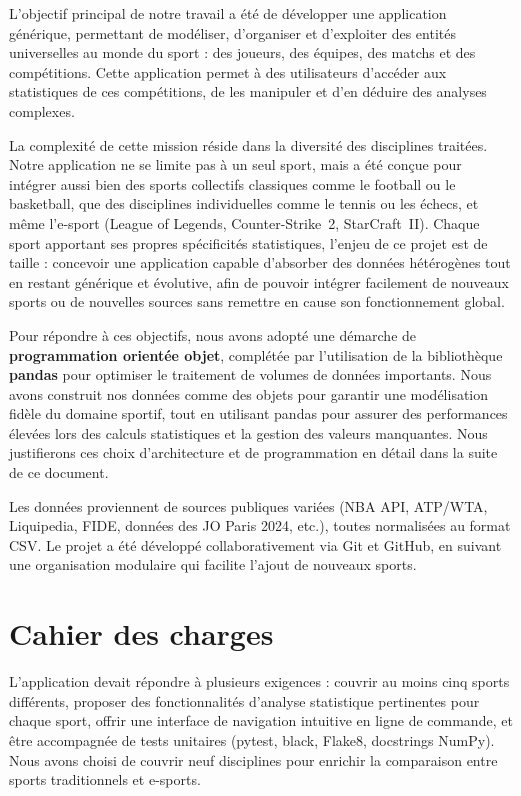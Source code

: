 \documentclass[12pt,a4paper]{article}
\begin{document}
L'objectif principal de notre travail a été de développer une application générique,
permettant de modéliser, d'organiser et d'exploiter des entités universelles au monde du
sport : des joueurs, des équipes, des matchs et des compétitions. Cette application permet
à des utilisateurs d'accéder aux statistiques de ces compétitions, de les manipuler et d'en
déduire des analyses complexes.

La complexité de cette mission réside dans la diversité des disciplines traitées. Notre
application ne se limite pas à un seul sport, mais a été conçue pour intégrer aussi bien
des sports collectifs classiques comme le football ou le basketball, que des disciplines
individuelles comme le tennis ou les échecs, et même l'e-sport (League of Legends,
Counter-Strike~2, StarCraft~II). Chaque sport apportant ses propres spécificités
statistiques, l'enjeu de ce projet est de taille : concevoir une application capable
d'absorber des données hétérogènes tout en restant générique et évolutive, afin de
pouvoir intégrer facilement de nouveaux sports ou de nouvelles sources sans remettre en
cause son fonctionnement global.

Pour répondre à ces objectifs, nous avons adopté une démarche de \textbf{programmation
orientée objet}, complétée par l'utilisation de la bibliothèque \textbf{pandas} pour
optimiser le traitement de volumes de données importants. Nous avons construit nos
données comme des objets pour garantir une modélisation fidèle du domaine sportif,
tout en utilisant pandas pour assurer des performances élevées lors des calculs
statistiques et la gestion des valeurs manquantes. Nous justifierons ces choix
d'architecture et de programmation en détail dans la suite de ce document.

Les données proviennent de sources publiques variées (NBA API, ATP/WTA, Liquipedia,
FIDE, données des JO Paris 2024, etc.), toutes normalisées au format CSV. Le projet a
été développé collaborativement via Git et GitHub, en suivant une organisation modulaire
qui facilite l'ajout de nouveaux sports.

\section{Cahier des charges}
\label{sec:cdc}

L'application devait répondre à plusieurs exigences : couvrir au moins cinq sports
différents, proposer des fonctionnalités d'analyse statistique pertinentes pour chaque
sport, offrir une interface de navigation intuitive en ligne de commande, et être
accompagnée de tests unitaires (pytest, black, Flake8, docstrings NumPy). Nous avons
choisi de couvrir neuf disciplines pour enrichir la comparaison entre sports traditionnels
et e-sports.
\end{document}
